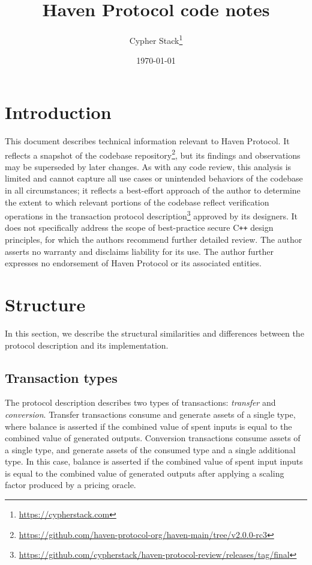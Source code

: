 \documentclass{article}
\title{Haven Protocol code notes}
\author{Cypher Stack\thanks{\url{https://cypherstack.com}}}
\date{\today}
\begin{document}
\maketitle


\section{Introduction}

This document describes technical information relevant to Haven Protocol.
It reflects a snapshot of the codebase repository\footnote{\url{https://github.com/haven-protocol-org/haven-main/tree/v2.0.0-rc3}}, but its findings and observations may be superseded by later changes.
As with any code review, this analysis is limited and cannot capture all use cases or unintended behaviors of the codebase in all circumstances; it reflects a best-effort approach of the author to determine the extent to which relevant portions of the codebase reflect verification operations in the transaction protocol description\footnote{\url{https://github.com/cypherstack/haven-protocol-review/releases/tag/final}} approved by its designers.
It does not specifically address the scope of best-practice secure C\texttt{++} design principles, for which the authors recommend further detailed review.
The author asserts no warranty and disclaims liability for its use.
The author further expresses no endorsement of Haven Protocol or its associated entities.


\section{Structure}

In this section, we describe the structural similarities and differences between the protocol description and its implementation.

\subsection{Transaction types}

The protocol description describes two types of transactions: \textit{transfer} and \textit{conversion}.
Transfer transactions consume and generate assets of a single type, where balance is asserted if the combined value of spent inputs is equal to the combined value of generated outputs.
Conversion transactions consume assets of a single type, and generate assets of the consumed type and a single additional type.
In this case, balance is asserted if the combined value of spent input inputs is equal to the combined value of generated outputs after applying a scaling factor produced by a pricing oracle.
\end{document}
